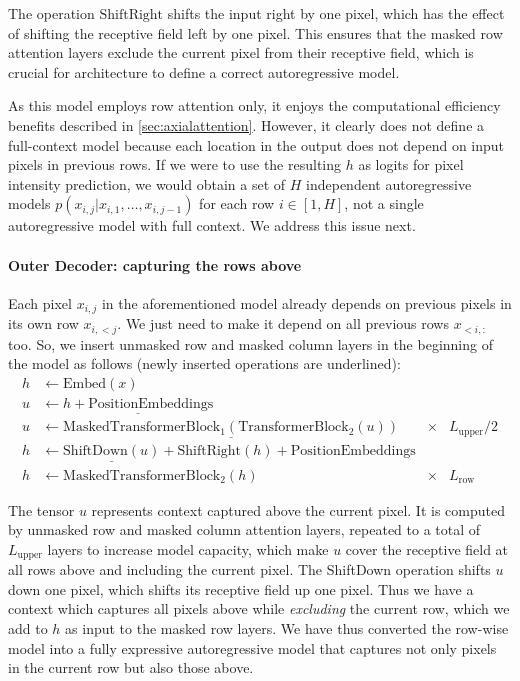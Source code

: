 \documentclass{article} \usepackage{iclr2020_conference,times}
\begin{document}
The operation $\text{ShiftRight}$ shifts the input right by one pixel, which has the effect of shifting the receptive field left by one pixel. This ensures that the masked row attention layers exclude the current pixel from their receptive field, which is crucial for architecture to define a correct autoregressive model.

As this model employs row attention only, it enjoys the computational efficiency benefits described in \cref{sec:axialattention}. However, it clearly does not define a full-context model because each location in the output does not depend on input pixels in previous rows. If we were to use the resulting $h$ as logits for pixel intensity prediction, we would obtain a set of $H$ independent autoregressive models $p(x_{i,j} | x_{i,1}, \dotsc, x_{i,j-1})$ for each row $i \in [1, H]$, not a single autoregressive model with full context.
We address this issue next.


\vspace{-0.5em}
\paragraph{Outer Decoder: capturing the rows above}
\label{sec:fullyexpressivesinglechannel}

Each pixel $x_{i,j}$ in the aforementioned model already depends on previous pixels in its own row $x_{i,<j}$. We just need to make it depend on all previous rows $x_{<i,:}$ too. So, we insert unmasked row and masked column layers in the beginning of the model as follows (newly inserted operations are underlined):
\begin{align*}
    h &\gets \text{Embed}(x) \\
    u &\gets \underline{h + \text{PositionEmbeddings}} \\
    u &\gets \underline{\text{MaskedTransformerBlock}_{1}(\text{TransformerBlock}_{2}(u)) } &\times &L_\text{upper}/2 \\
    h &\gets \underline{\text{ShiftDown}(u)} + \text{ShiftRight}(h) + \text{PositionEmbeddings} \\
    h &\gets \text{MaskedTransformerBlock}_{2}(h) &\times &L_\text{row}
\end{align*}


The tensor $u$ represents context captured above the current pixel. It is computed by unmasked row and masked column attention layers, repeated to a total of $L_\text{upper}$ layers to increase model capacity, which make $u$ cover the receptive field at all rows above and including the current pixel. The ShiftDown operation shifts $u$ down one pixel, which shifts its receptive field up one pixel. Thus we have a context which captures all pixels above while \emph{excluding} the current row, which we add to $h$ as input to the masked row layers. We have thus converted the row-wise model into a fully expressive autoregressive model that captures not only pixels in the current row but also those above.
\end{document}

